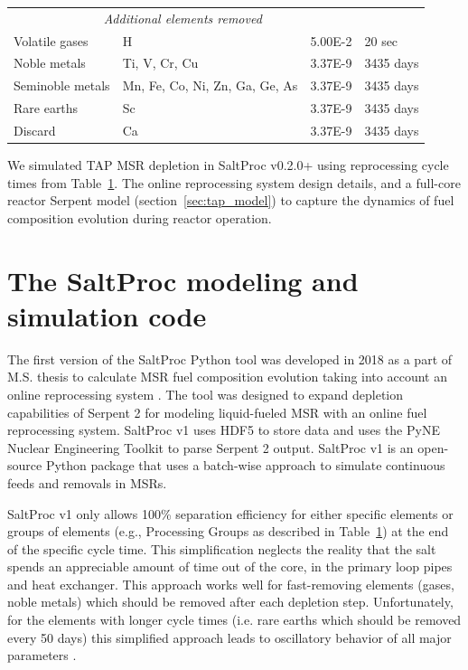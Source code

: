 \documentclass[12pt]{article} %
\begin{document}
\begin{table}[ht!]
\begin{tabular}{p{} p{} p{} p{}}
 \multicolumn{3}{c}{\textit{Additional elements removed} \cite{transatomic_power_corporation_neutronics_2016, betzler_implementation_2017}  } \\
        Volatile gases & H								  	& 5.00E-2 & 20 sec    \\ [5pt]
        Noble metals & Ti, V, Cr, Cu						& 3.37E-9 & 3435 days \\ [5pt]
        Seminoble metals & Mn, Fe, Co, Ni, Zn, Ga, Ge, As   & 3.37E-9 & 3435 days \\ [5pt]
        Rare earths & Sc									& 3.37E-9 & 3435 days \\ [5pt]
        Discard & Ca										& 3.37E-9 & 3435 days \\ [5pt] 
        \hline
        \end{tabular}
        \label{tab:reprocessing_list}
          \vspace{-0.9em}
\end{table}

We simulated \gls{TAP} \gls{MSR} depletion in SaltProc v0.2.0+ using  
reprocessing cycle times from Table~\ref{tab:reprocessing_list}. The online 
reprocessing system design details, and a full-core reactor Serpent model 
(section~\ref{sec:tap_model}) to capture the dynamics of fuel composition 
evolution during reactor operation.

\section{The SaltProc modeling and simulation code} \label{sec:tool}
The first version of the SaltProc Python tool was developed in 2018 as a part 
of M.S. thesis to calculate \gls{MSR} fuel composition evolution taking into 
account an online reprocessing system \cite{rykhlevskii_advanced_2018,
rykhlevskii_arfc/saltproc_2018}. The tool was designed to expand depletion 
capabilities of Serpent 2 for modeling liquid-fueled \gls{MSR} with an online 
fuel reprocessing system. SaltProc v1 uses HDF5  
\cite{the_hdf_group_hierarchical_1997} to store data and uses the PyNE Nuclear 
Engineering Toolkit \cite{scopatz_pyne_2012} to parse Serpent 2 output. 
SaltProc v1 is an open-source Python package that uses a batch-wise approach 
to simulate continuous feeds and removals in \glspl{MSR}. 

SaltProc v1 only allows 100\% separation efficiency for either specific 
elements or groups of elements (e.g., Processing Groups as described in 
Table~\ref{tab:reprocessing_list}) at the end of the specific cycle time. This 
simplification neglects the reality that the salt spends an appreciable amount 
of time out of the core, in the primary loop pipes and heat exchanger. This 
approach works well for fast-removing elements (gases, noble metals) which 
should be removed after each depletion step. Unfortunately, for the elements 
with longer cycle times (i.e. rare earths which should be removed every 50 
days) this simplified approach leads to oscillatory behavior of all major 
parameters \cite{rykhlevskii_modeling_2019}. 
\end{document}
